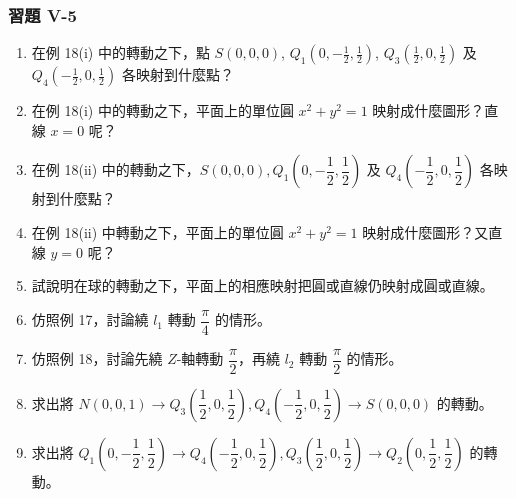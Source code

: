 \subsubsection*{習題 V-5}

\begin{enumerate}
  \item 在例 18(i) 中的轉動之下，點 $S(0, 0, 0)$, $Q_1\left(0, -\frac{1}{2}, \frac{1}{2}\right)$, $Q_3\left(\frac{1}{2}, 0, \frac{1}{2}\right)$ 及 $Q_4\left(-\frac{1}{2}, 0, \frac{1}{2}\right)$ 各映射到什麼點？
  \item 在例 18(i) 中的轉動之下，平面上的單位圓 $x^2+y^2=1$ 映射成什麼圖形？直線 $x=0$ 呢？
  \item 在例 18(ii) 中的轉動之下，$S(0, 0, 0), Q_1\left(0, -\dfrac{1}{2}, \dfrac{1}{2}\right)$ 及 $Q_4\left(-\dfrac{1}{2}, 0, \dfrac{1}{2}\right)$ 各映射到什麼點？
  \item 在例 18(ii) 中轉動之下，平面上的單位圓 $x^2+y^2=1$ 映射成什麼圖形？又直線 $y=0$ 呢？
  \item 試說明在球的轉動之下，平面上的相應映射把圓或直線仍映射成圓或直線。
  \item 仿照例 17，討論繞 $l_1$ 轉動 $\dfrac{\pi}{4}$ 的情形。
  \item 仿照例 18，討論先繞 $Z$-軸轉動 $\dfrac{\pi}{2}$，再繞 $l_2$ 轉動 $\dfrac{\pi}{2}$ 的情形。
  \item 求出將 $N(0, 0, 1) \longrightarrow Q_3\left(\dfrac{1}{2}, 0, \dfrac{1}{2}\right), Q_4\left(-\dfrac{1}{2}, 0, \dfrac{1}{2}\right) \longrightarrow S(0, 0, 0)$ 的轉動。
  \item 求出將 $Q_1\left(0, -\dfrac{1}{2}, \dfrac{1}{2}\right) \longrightarrow Q_4\left(-\dfrac{1}{2}, 0, \dfrac{1}{2}\right), Q_3\left(\dfrac{1}{2}, 0, \dfrac{1}{2}\right) \longrightarrow Q_2\left(0, \dfrac{1}{2}, \dfrac{1}{2}\right)$ 的轉動。
\end{enumerate}

